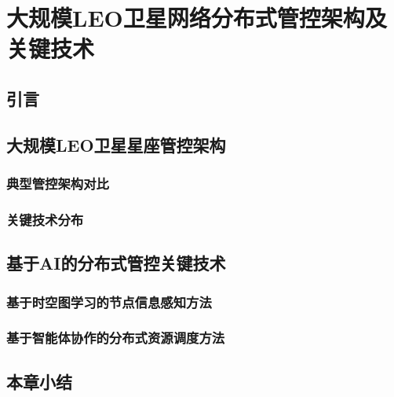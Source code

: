 \chapter{大规模LEO卫星网络分布式管控架构及关键技术}
\label{chap:arch-techniques}

\section{引言}

\section{大规模LEO卫星星座管控架构}
\subsection{典型管控架构对比}

\subsection{关键技术分布}


\section{基于AI的分布式管控关键技术}

\subsection{基于时空图学习的节点信息感知方法}

\subsection{基于智能体协作的分布式资源调度方法}

\section{本章小结}